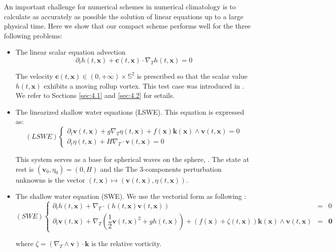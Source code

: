 An important challenge for numerical schemes in numerical climatology 
is to calculate as accurately as possible 
the solution of linear equations up to a large physical time.
Here we show that our compact scheme performs well
for the three following problems:
\begin{itemize}
\item 
The linear scalar equation
advection 
\begin{equation}
\label{eq:adv}
\partial_t h(t,\mathbf{x})+ \mathbf{c}(t,\mathbf{x}) \cdot \nabla_T h(t,\mathbf{x})=0
\end{equation}

The velocity $\mathbf{c}(t,\mathbf{x}) \in (0, +\infty) \times \mathbb{S}^2$ is prescribed
so that the scalar value $h(t,\mathbf{x})$ exhibits a moving rollup vortex.
This test case was introduced
in \cite{Nair-Machenhauer,Nair-Jablonowski}. We refer to Sections
\ref{sec:4.1} and \ref{sec:4.2} for setails.
\item
The linearized shallow water equations (LSWE). This equation
is expressed as:
\begin{equation}
\label{eq:lswe}
(LSWE) \left\{
\begin{array}{l}
\partial_t \mathbf{v}(t,\mathbf{x})+ g \nabla_T \eta(t,\mathbf{x}) + f(\mathbf{x}) \mathbf{k}(\mathbf{x}) \wedge
\mathbf{v}(t,\mathbf{x})=0\\
\partial_t \eta(t,\mathbf{x})+ H \nabla_T \cdot \mathbf{v}(t,\mathbf{x})=0
\end{array}
\right.
\end{equation}


This system serves as a base for spherical waves on the sphere,
\cite{Paldor}. The state at rest is 
$(\mathbf{v}_0,\eta_0)=(0,H)$ and the 
The 3-components perturbation unknowns is
the vector $(t,\mathbf{x}) \mapsto (\mathbf{v}(t,\mathbf{x}), \eta(t,\mathbf{x}))$.
\item The shallow water equation (SWE). We use the vectorial form as following :
\begin{equation}
\label{eq:swe}
(SWE) \left\lbrace
\begin{array}{rcl}
\partial_t h(t,\mathbf{x}) + \nabla_T \cdot \left( h(t,\mathbf{x}) \mathbf{v}(t,\mathbf{x}) \right) & = & 0 \\
\partial_t \mathbf{v}(t,\mathbf{x}) + \nabla_T \left( \dfrac{1}{2} \mathbf{v}(t,\mathbf{x})^2 + g h(t,\mathbf{x}) \right) + \left( f(\mathbf{x}) + \zeta(t,\mathbf{x}) \right) \mathbf{k}(\mathbf{x}) \wedge \mathbf{v}(t,\mathbf{x}) & = & \mathbf{0} 
\end{array}
\right.
\end{equation}

where $\zeta = \left( \nabla_T \wedge \mathbf{v} \right) \cdot \mathbf{k}$ is the relative vorticity.
\end{itemize}

